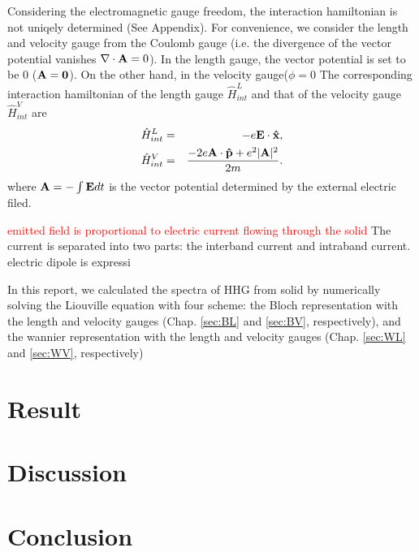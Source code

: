 \documentclass[aps,prb,preprint]{revtex4-1}
\begin{document}
Considering the electromagnetic gauge freedom, the interaction hamiltonian is not uniqely determined (See Appendix). For convenience, we consider the length and velocity gauge from the Coulomb gauge (i.e. the divergence of the vector potential vanishes $\nabla \cdot {\bf A} = 0$). In the length gauge, the vector potential is set to be 0 (${\bf A} = {\bf 0}$). On the other hand, in the velocity gauge($\phi = 0$
The corresponding interaction hamiltonian of the length gauge  $\hat{H}^{L}_{int}$ and that of the velocity gauge $\hat{H}^{V}_{int}$ are 
 \begin{eqnarray}
 \hat{H}^{L}_{int} &=&  -e{\bf E} \cdot {\bf \hat{x}}, \\
 \hat{H}^{V}_{int} &=& \frac{- 2e{\bf A} \cdot {\bf \hat{p}} + e^2 |{\bf A}|^2}{2m}. 
\end{eqnarray}
where ${\bf A} = - \int {\bf E} dt$ is the vector potential determined by the external electric filed. 

\textcolor{red}{emitted field is proportional to electric current flowing through the solid}
The current is separated into two parts: the interband current and intraband current.\cite{Foldi}
electric dipole is expressi

In this report, we calculated the spectra of HHG from solid by numerically solving the Liouville equation with four scheme: the Bloch representation with the length and velocity gauges (Chap. \ref{sec:BL} and \ref{sec:BV}, respectively), and the wannier representation with the length and velocity gauges (Chap. \ref{sec:WL} and \ref{sec:WV}, respectively)

\section{Result}

\section{Discussion}

\section{Conclusion}

\newpage
\fi
\end{document}

